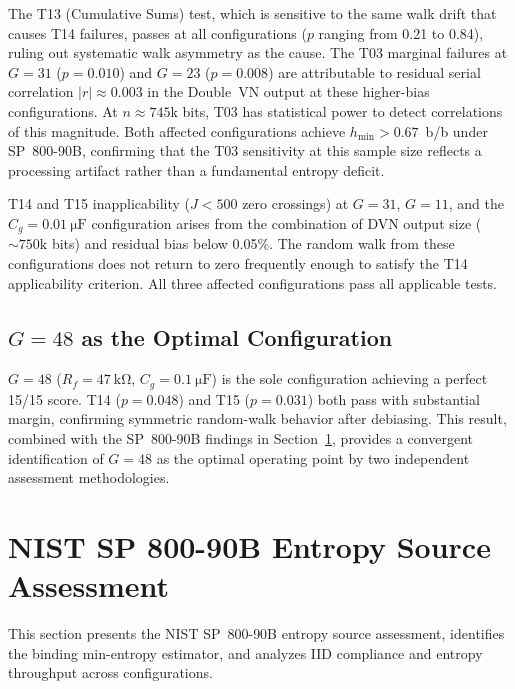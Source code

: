 \documentclass[conference]{IEEEtran}
\newcommand{\hmin}{\ensuremath{h_{\min}}}
\newcommand{\Cg}{\ensuremath{C_g}}
\newcommand{\Rf}{\ensuremath{R_f}}
\begin{document}
The T13 (Cumulative Sums) test, which is sensitive to
the same walk drift that causes T14 failures, passes at all
configurations ($p$ ranging from 0.21 to 0.84), ruling out systematic
walk asymmetry as the cause. The T03 marginal failures at $G=31$
($p=0.010$) and $G=23$ ($p=0.008$) are attributable to residual
serial correlation $|r|\!\approx\!0.003$ in the Double~VN output at
these higher-bias configurations. At $n\!\approx\!745\mathrm{k}$
bits, T03 has statistical power to detect correlations of this
magnitude. Both affected configurations achieve $\hmin>0.67$~b/b
under SP~800-90B, confirming that the T03 sensitivity at this sample
size reflects a processing artifact rather than a fundamental entropy
deficit.

T14 and T15 inapplicability ($J<500$ zero crossings) at $G=31$,
$G=11$, and the $\Cg=\SI{0.01}{\micro\farad}$ configuration arises
from the combination of DVN output size ($\sim 750\mathrm{k}$ bits)
and residual bias below 0.05\%. The random walk from these
configurations does not return to zero frequently enough to satisfy
the T14 applicability criterion. All three affected configurations
pass all applicable tests.

\subsection{$G=48$ as the Optimal Configuration}

$G=48$ ($\Rf=\SI{47}{\kilo\ohm}$, $\Cg=\SI{0.1}{\micro\farad}$) is
the sole configuration achieving a perfect 15/15 score. T14
($p=0.048$) and T15 ($p=0.031$) both pass with substantial margin,
confirming symmetric random-walk behavior after debiasing. This
result, combined with the SP~800-90B findings in
Section~\ref{sec:nist90b}, provides a convergent identification of
$G=48$ as the optimal operating point by two independent assessment
methodologies.

\section{NIST SP 800-90B Entropy Source Assessment}\label{sec:nist90b}
This section presents the NIST SP~800-90B entropy source assessment,
identifies the binding min-entropy estimator, and analyzes IID
compliance and entropy throughput across configurations.
\end{document}

